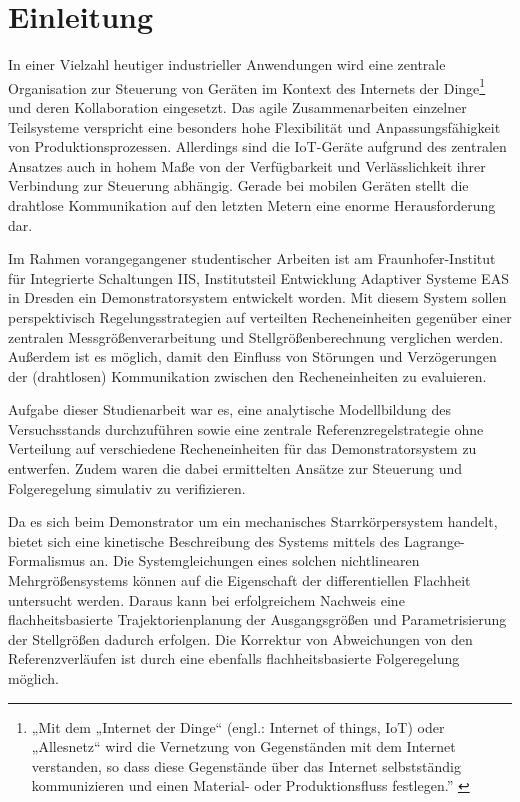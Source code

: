 \chapter{Einleitung}
\pagestyle{scrheadings}
\setcounter{page}{1}

In einer Vielzahl heutiger industrieller Anwendungen wird eine zentrale Organisation zur Steuerung von Geräten im Kontext des Internets der Dinge\footnote{„Mit dem „Internet der Dinge“ (engl.: Internet of things, IoT) oder „Allesnetz“ wird die Vernetzung von 
Gegenständen mit dem Internet verstanden, so dass diese Gegenstände über das Internet 
selbstständig kommunizieren und einen Material- oder Produktionsfluss festlegen.'' \cite{BegriffeIndustrie40}} und deren Kollaboration eingesetzt. Das agile Zusammenarbeiten einzelner Teilsysteme verspricht eine besonders hohe Flexibilität und Anpassungsfähigkeit von Produktionsprozessen. Allerdings sind die IoT-Geräte aufgrund des zentralen Ansatzes auch in hohem Maße von der Verfügbarkeit und Verlässlichkeit ihrer Verbindung zur Steuerung abhängig. Gerade bei mobilen Geräten stellt die drahtlose Kommunikation auf den letzten Metern eine enorme Herausforderung dar.

Im Rahmen vorangegangener studentischer Arbeiten ist am Fraunhofer-Institut für Integrierte Schaltungen IIS, Institutsteil Entwicklung Adaptiver Systeme EAS \cite{fraunhoferIISEAS} in Dresden ein Demonstratorsystem entwickelt worden. Mit diesem System sollen perspektivisch Regelungsstrategien auf verteilten Recheneinheiten gegenüber einer zentralen Messgrößenverarbeitung und Stellgrößenberechnung verglichen werden. Außerdem ist es möglich, damit den Einfluss von Störungen und Verzögerungen der (drahtlosen) Kommunikation zwischen den Recheneinheiten zu evaluieren.

Aufgabe dieser Studienarbeit war es, eine analytische Modellbildung des Versuchsstands durchzuführen sowie eine zentrale Referenzregelstrategie ohne Verteilung auf verschiedene Recheneinheiten für das Demonstratorsystem zu entwerfen. Zudem waren die dabei ermittelten Ansätze zur Steuerung und Folgeregelung simulativ zu verifizieren.

Da es sich beim Demonstrator um ein mechanisches Starrkörpersystem handelt, bietet sich eine kinetische Beschreibung des Systems mittels des Lagrange-Formalismus an. Die Systemgleichungen eines solchen nichtlinearen Mehrgrößensystems können auf die Eigenschaft der differentiellen Flachheit untersucht werden. Daraus kann bei erfolgreichem Nachweis eine flachheitsbasierte Trajektorienplanung der Ausgangsgrößen und Parametrisierung der Stellgrößen dadurch erfolgen. Die Korrektur von Abweichungen von den Referenzverläufen ist durch eine ebenfalls flachheitsbasierte Folgeregelung möglich.

